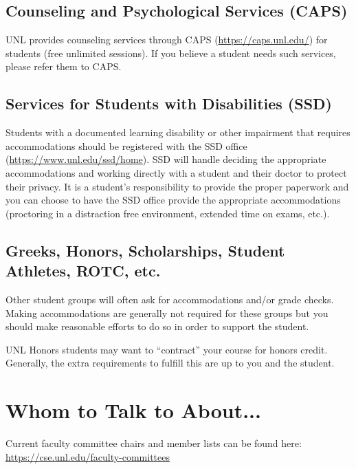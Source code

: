 \documentclass[12pt]{scrartcl}
\begin{document}
\subsection{Counseling and Psychological Services (CAPS)}

UNL provides counseling services through CAPS 
(\url{https://caps.unl.edu/}) for students (free unlimited 
sessions).  If you believe a student needs such services, please
refer them to CAPS.

\subsection{Services for Students with Disabilities (SSD)}

Students with a documented learning disability or other impairment
that requires accommodations should be registered with the 
SSD office (\url{https://www.unl.edu/ssd/home}).  SSD will handle
deciding the appropriate accommodations and working directly
with a student and their doctor to protect their privacy.  
It is a student's responsibility to provide the proper paperwork
and you can choose to have the SSD office provide the appropriate
accommodations (proctoring in a distraction free environment, 
extended time on exams, etc.).

\subsection{Greeks, Honors, Scholarships, Student Athletes, ROTC, etc.}

Other student groups will often ask for accommodations and/or
grade checks.  Making accommodations are generally not required
for these groups but you should make reasonable efforts to do so
in order to support the student.  

UNL Honors students may want to ``contract'' your course for honors
credit.  Generally, the extra requirements to fulfill this are up
to you and the student.


\section{Whom to Talk to About...}

Current faculty committee chairs and member lists can be found
here: \url{https://cse.unl.edu/faculty-committees}
\end{document}
